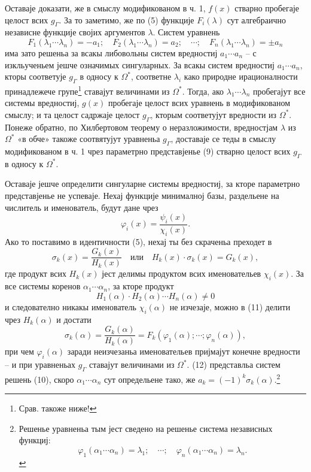 ﻿\documentclass[11pt]{article}
\begin{document}
Оставаје доказати, же в смыслу модификованом в ч. 1, $f(x)$ стварно пробегаје целост всих $g_\Gamma$. За то заметимо, же по (5) функције $F_i(\lambda)$ сут алгебраично независне функције својих аргументов $\lambda$. Систем уравнень
\begin{equation}
F_1(\lambda_1\cdots\lambda_n)=-a_1;\quad F_2(\lambda_1\cdots\lambda_n)=a_2;\quad \cdots;\quad F_n(\lambda_1\cdots\lambda_n)=\pm a_n
\tag{10}
\end{equation}
има зато решеньа за всакы либовольны систем вредностиј $a_1\cdots a_n$ -- с изкльученьем јешче означимых сингуларных. За всакы систем вредностиј $a_1\cdots a_n$, кторы соответује $g_\Gamma$ в односу к $\Omega^*$, соответне $\lambda_i$ како природне ирационалности принадлежече групе\footnote{Срав. такоже ниже!} ставајут величинами из $\Omega^*$. Тогда, ако $\lambda_1\cdots\lambda_n$ пробегајут все системы вредностиј, $g(x)$ пробегаје целост всих уравнень в модификованом смыслу; и та целост садржаје целост $g_\Gamma$, кторым соответујут вредности из $\Omega^*$. Понеже обратно, по Хилбертовом теорему о неразложимости, вредностјам $\lambda$ из $\Omega^*$ «в обче» такоже соотвятујут уравненьа $g_\Gamma$, доставаје се теды в смыслу модификованом в ч. 1 чрез параметрно представјенье (9) стварно целост всих $g_\Gamma$ в односу к $\Omega^*$.

Оставаје јешче определити сингуларне системы вредностиј, за кторе параметрно представјенье не успеваје. Нехај функције минималној базы, раздельене на числитель и именователь, будут дане чрез
\[
\varphi_i(x)=\frac{\psi_i(x)}{\chi_i(x)}.
\]
Ако то поставимо в идентичности (5), нехај ты без скраченьа преходет в
\begin{equation}
\sigma_k(x)=\frac{G_k(x)}{H_k(x)}\quad\text{или}\quad H_k(x)\cdot\sigma_k(x)=G_k(x),
\tag{11}
\end{equation}
где продукт всих $H_k(x)$ јест делимы продуктом всих именовательев $\chi_i(x)$. За все системы коренов $\alpha_1\cdots\alpha_n$, за кторе продукт
\[
H_1(\alpha)\cdot H_2(\alpha)\cdots H_n(\alpha)\neq0
\]
и следователно никакы именователь $\chi_i(\alpha)$ не изчезаје, можно в (11) делити чрез $H_k(\alpha)$ и достати
\begin{equation}
\sigma_k(\alpha)=\frac{G_k(\alpha)}{H_k(\alpha)}=F_k(\varphi_1(\alpha);\cdots;\varphi_n(\alpha)),
\tag{12}
\end{equation}
при чем $\varphi_i(\alpha)$ заради неизчезаньа именовательев пријмајут конечне вредности -- и при уравненьах $g_\Gamma$ ставајут величинами из $\Omega^*$. (12) представльа систем решень (10), скоро $\alpha_1\cdots\alpha_n$ сут определьене тако, же $a_k=(-1)^k\sigma_k(\alpha)$.\footnote{Решенье уравненьа тым јест сведено на решенье система независных функциј:
\[
\varphi_1(\alpha_1\cdots\alpha_n)=\lambda_1;\quad \cdots;\quad \varphi_n(\alpha_1\cdots\alpha_n)=\lambda_n.
\]}
\end{document}
